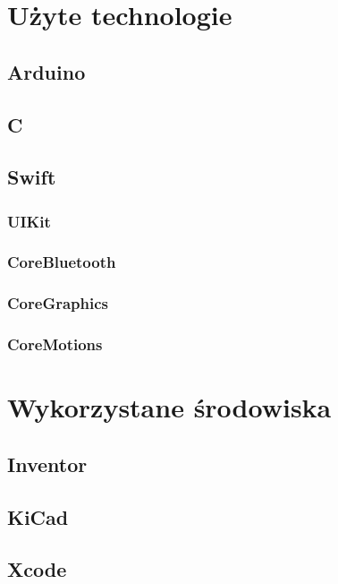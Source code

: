 \chapter{Użyte technologie}
\section{Arduino}
\section{C}
\section{Swift}
\subsection{UIKit}
\subsection{CoreBluetooth}
\subsection{CoreGraphics}
\subsection{CoreMotions}

\chapter{Wykorzystane środowiska}
\section{Inventor}
\section{KiCad}
\section{Xcode}
